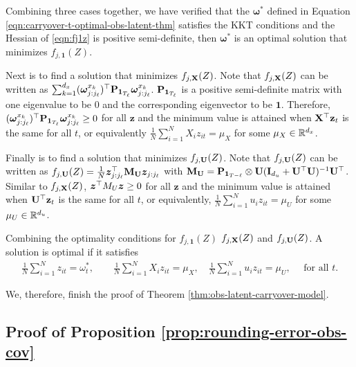 	Combining three cases together,	we have verified that the $\bm{\omega}^\ast$ defined in Equation \eqref{eqn:carryover-t-optimal-obs-latent-thm} satisfies the KKT conditions and the Hessian of \eqref{eqn:fj1z} is positive semi-definite, then  $\bm{\omega}^\ast$ is an optimal solution that minimizes $f_{j,\bm{1}}(Z)$.

    Next is to find a solution that minimizes $f_{j,\mathbf{X}}(Z)$. Note that $f_{j,\mathbf{X}}(Z) $ can be written as $ \sum_{k=1}^{d_x}  (\bm{\omega}_{j:j_\ell}^{x_k})^\top \mathbf{P}_{\bm{1}_{T_\ell}}  \bm{\omega}_{j:j_\ell}^{x_k} $. $\mathbf{P}_{\bm{1}_{T_\ell}}$ is a positive semi-definite matrix with one eigenvalue to be $0$ and the corresponding eigenvector to be $\bm{1}$. Therefore, $(\bm{\omega}_{j:j_\ell}^{x_k})^\top \mathbf{P}_{\bm{1}_{T_\ell}}  \bm{\omega}_{j:j_\ell}^{x_k}  \geq 0$  for all $\bm{z}$ and the minimum value is attained when $\mathbf{X}^\top \mathbf{z}_t$ is the same for all $t$, or equivalently $\frac{1}{N} \sum_{i = 1}^N X_{i} z_{it} = \mu_X$ for some $\mu_X \in \mathbb{R}^{d_x}$. 

    
    Finally is to find a solution that minimizes $f_{j,\mathbf{U}}(Z)$. Note that $f_{j,\mathbf{U}}(Z) $ can be written as $f_{j,\mathbf{U}}(Z) = \frac{1}{N} \bm{z}_{j:j_\ell}^\top\mathbf{M}_{\mathbf{U}}  \bm{z}_{j:j_\ell} $ with $\mathbf{M}_{\mathbf{U}} = \mathbf{P}_{\bm{1}_{T-\ell}} \otimes \mathbf{U} (\mathbf{I}_{d_u} + \mathbf{U}^\top \mathbf{U})^{-1} \mathbf{U}^\top$. Similar to $f_{j,\mathbf{X}}(Z)$,  $\bm{z}^\top M_U \bm{z} \geq 0$ for all $\bm{z}$ and the minimum value is  attained when $ \mathbf{U}^\top \mathbf{z}_t$  is the same for all $t$, or equivalently, $\frac{1}{N} \sum_{i = 1}^N u_{i} z_{it} = \mu_U$ for some $\mu_U \in \mathbb{R}^{d_u}$.
		
	Combining the optimality conditions for $f_{j,\bm{1}}(Z)$ $f_{j,\mathbf{X}}(Z)$ and $f_{j,\mathbf{U}}(Z)$. A solution is optimal if it satisfies
		\begin{eqnarray}
		\frac{1}{N} \sum_{i = 1}^N z_{it} = \omega_t^\ast, \quad \quad \frac{1}{N} \sum_{i = 1}^N X_i z_{it} = \mu_X , \quad \frac{1}{N} \sum_{i = 1}^N u_{i} z_{it} = \mu_U, \quad  \text{ for all } t.
		\end{eqnarray}
		
		We, therefore, finish the proof of Theorem \ref{thm:obs-latent-carryover-model}.
		\Halmos
		\endproof
		
		
		
		\subsection{Proof of Proposition \ref{prop:rounding-error-obs-cov}}
		

